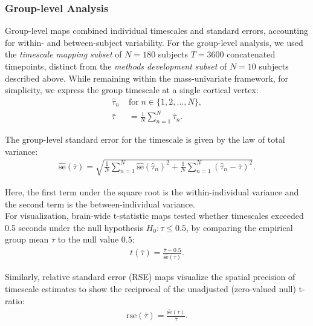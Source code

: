 \documentclass[docs/main.tex]{subfiles}
\begin{document}
\subsubsection{Group-level Analysis}\label{sec:group-level-analysis}
Group-level maps combined individual timescales and standard errors, accounting for within- and between-subject variability. For the group-level analysis, we used the \textit{timescale mapping subset} of $N=180$ subjects $T=3600$ concatenated timepoints, distinct from the \textit{methods development subset} of $N=10$ subjects described above. While remaining within the mass-univariate framework, for simplicity, we express the group timescale at a single cortical vertex:
\begin{align}
    \hat\tau_n \; &\text{for} \; n\in\{1, 2, ..., N\},\\
    \bar\tau &= \frac{1}{N} \sum_{n=1}^N \hat\tau_n.
\end{align}

\noindent The group-level standard error for the timescale is given by the law of total variance:
\begin{align}
    \widehat{\text{se}}(\bar\tau) = \sqrt{\frac{1}{N} \sum_{n=1}^N \widehat{\text{se}}(\hat\tau_n)^2 + \frac{1}{N} \sum_{n=1}^N (\hat\tau_n - \bar\tau)^2}.
\end{align}

\noindent Here, the first term under the square root is the within-individual variance and the second term is the between-individual variance.\\

For visualization, brain-wide t-statistic maps tested whether timescales exceeded 0.5 seconds under the null hypothesis $H_0: \tau \leq 0.5$, by comparing the empirical group mean $\bar\tau$ to the null value $0.5$:
\begin{align}\label{eq:t-ratio}
    t(\bar\tau) = \frac{\bar\tau-0.5}{\widehat{\text{se}}(\bar\tau)}.
\end{align}

\noindent Similarly, relative standard error (RSE) maps visualize the spatial precision of timescale estimates to show the reciprocal of the unadjusted (zero-valued null) t-ratio:
\begin{align}
    \text{rse}(\bar\tau) = \frac{\widehat{\text{se}}(\bar\tau)}{\bar\tau}.
\end{align}
\end{document}
